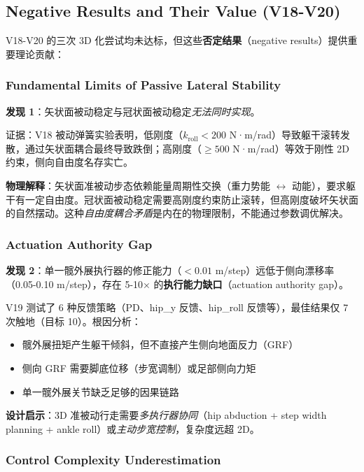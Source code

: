 
\subsection{Negative Results and Their Value (V18-V20)}

V18-V20 的三次 3D 化尝试均未达标，但这些\textbf{否定结果}（negative results）提供重要理论贡献：

\subsubsection{Fundamental Limits of Passive Lateral Stability}

\textbf{发现 1}：矢状面被动稳定与冠状面被动稳定\textit{无法同时实现}。

证据：V18 被动弹簧实验表明，低刚度（$k_{\text{roll}} < 200$ N·m/rad）导致躯干滚转发散，通过矢状面耦合最终导致跌倒；高刚度（$\geq 500$ N·m/rad）等效于刚性 2D 约束，侧向自由度名存实亡。

\textbf{物理解释}：矢状面准被动步态依赖能量周期性交换（重力势能 $\leftrightarrow$ 动能），要求躯干有一定自由度。冠状面被动稳定需要高刚度约束防止滚转，但高刚度破坏矢状面的自然摆动。这种\textit{自由度耦合矛盾}是内在的物理限制，不能通过参数调优解决。

\subsubsection{Actuation Authority Gap}

\textbf{发现 2}：单一髋外展执行器的修正能力（$<0.01$ m/step）远低于侧向漂移率（0.05-0.10 m/step），存在 5-10× 的\textbf{执行能力缺口}（actuation authority gap）。

V19 测试了 6 种反馈策略（PD、hip\_y 反馈、hip\_roll 反馈等），最佳结果仅 7 次触地（目标 10）。根因分析：
\begin{itemize}
    \item 髋外展扭矩产生躯干倾斜，但不直接产生侧向地面反力（GRF）
    \item 侧向 GRF 需要脚底位移（步宽调制）或足部侧向力矩
    \item 单一髋外展关节缺乏足够的因果链路
\end{itemize}

\textbf{设计启示}：3D 准被动行走需要\textit{多执行器协同}（hip abduction + step width planning + ankle roll）或\textit{主动步宽控制}，复杂度远超 2D。

\subsubsection{Control Complexity Underestimation}

